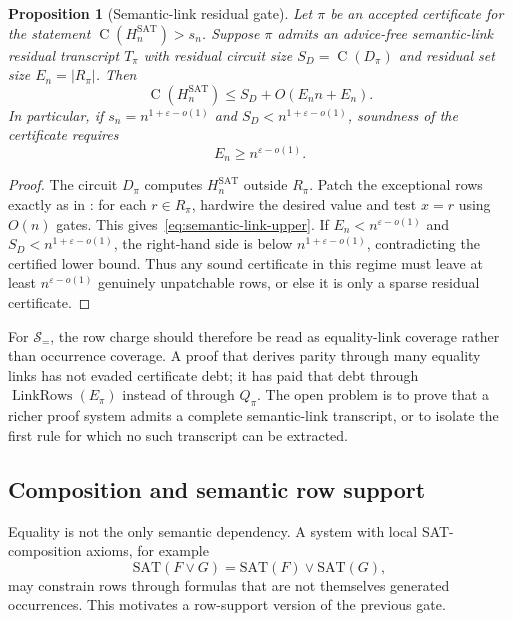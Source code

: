 \documentclass[11pt]{article}
\newtheorem{proposition}[theorem]{Proposition}
\theoremstyle{definition}
\newcommand{\Ckt}{\operatorname{C}}
\newcommand{\SAT}{\mathrm{SAT}}
\newcommand{\eps}{\varepsilon}
\newcommand{\Hsat}{H_n^{\SAT}}
\newcommand{\LinkRows}{\operatorname{LinkRows}}
\begin{document}
\begin{proposition}[Semantic-link residual gate]\label{prop:semantic-link-gate}
Let $\pi$ be an accepted certificate for the statement $\Ckt(\Hsat)>s_n$. Suppose $\pi$ admits an advice-free semantic-link residual transcript $T_\pi$ with residual circuit size $S_D=\Ckt(D_\pi)$ and residual set size $E_n=|R_\pi|$. Then
\begin{equation}\label{eq:semantic-link-upper}
  \Ckt(\Hsat)\le S_D+O(E_n n+E_n).
\end{equation}
In particular, if $s_n=n^{1+\eps-o(1)}$ and $S_D<n^{1+\eps-o(1)}$, soundness of the certificate requires
\begin{equation}\label{eq:semantic-link-threshold}
  E_n\ge n^{\eps-o(1)} .
\end{equation}
\end{proposition}

\begin{proof}
The circuit $D_\pi$ computes $\Hsat$ outside $R_\pi$. Patch the exceptional rows exactly as in : for each $r\in R_\pi$, hardwire the desired value and test $x=r$ using $O(n)$ gates. This gives~\eqref{eq:semantic-link-upper}. If $E_n<n^{\eps-o(1)}$ and $S_D<n^{1+\eps-o(1)}$, the right-hand side is below $n^{1+\eps-o(1)}$, contradicting the certified lower bound. Thus any sound certificate in this regime must leave at least $n^{\eps-o(1)}$ genuinely unpatchable rows, or else it is only a sparse residual certificate.
\end{proof}

For $\mathcal{S}_{=}$, the row charge should therefore be read as equality-link coverage rather than occurrence coverage. A proof that derives parity through many equality links has not evaded certificate debt; it has paid that debt through $\LinkRows(E_\pi)$ instead of through $Q_\pi$. The open problem is to prove that a richer proof system admits a complete semantic-link transcript, or to isolate the first rule for which no such transcript can be extracted.

\subsection{Composition and semantic row support}

Equality is not the only semantic dependency. A system with local SAT-composition axioms, for example
\[
  \SAT(F\lor G)=\SAT(F)\lor\SAT(G),
\]
may constrain rows through formulas that are not themselves generated occurrences. This motivates a row-support version of the previous gate.
\end{document}
